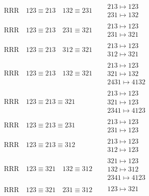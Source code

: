 \documentclass{article}
\begin{document}
\begin{align}
\\
\text{RRR}
\quad
123\equiv213
\quad
132\equiv231
\quad
&
\begin{matrix}
213 \mapsto 123
\\
231 \mapsto 132
\end{matrix}
\\
\text{RRR}
\quad
123\equiv213
\quad
231\equiv321
\quad
&
\begin{matrix}
213 \mapsto 123
\\
231 \mapsto 321
\end{matrix}
\\
\text{RRR}
\quad
123\equiv213
\quad
312\equiv321
\quad
&
\begin{matrix}
213 \mapsto 123
\\
312 \mapsto 321
\end{matrix}
\\
\text{RRR}
\quad
123\equiv213
\quad
132\equiv321
\quad
&
\begin{matrix}
213 \mapsto 123
\\
321 \mapsto 132
\\
2431 \mapsto 4132
\end{matrix}
\\
\text{RRR}
\quad
123\equiv213\equiv321
\quad
&
\begin{matrix}
213 \mapsto 123
\\
321 \mapsto 123
\\
2341 \mapsto 4123
\end{matrix}
\\
\text{RRR}
\quad
123\equiv213\equiv231
\quad
&
\begin{matrix}
213 \mapsto 123
\\
231 \mapsto 123
\end{matrix}
\\
\text{RRR}
\quad
123\equiv213\equiv312
\quad
&
\begin{matrix}
213 \mapsto 123
\\
312 \mapsto 123
\end{matrix}
\\
\text{RRR}
\quad
123\equiv321
\quad
132\equiv312
\quad
&
\begin{matrix}
321 \mapsto 123
\\
132 \mapsto 312
\\
2341 \mapsto 4123
\end{matrix}
\\
\text{RRR}
\quad
123\equiv321
\quad
231\equiv312
\quad
&
\begin{matrix}
123 \mapsto 321
\\

\end{matrix}
\end{align}
\end{document}
